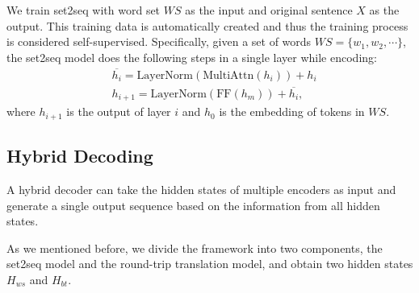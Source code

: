 We train set2seq with word set $WS$ as the input and original sentence 
$X$ as the output. This training data is automatically created and thus
the training process is considered self-supervised.
Specifically, given a set of words $WS = \{w_1, w_2,\cdots\}$, the set2seq model does the following steps in a single layer while encoding:
\begin{align}
& \overline{h_{i}} = \text{LayerNorm}(\text{MultiAttn}(h_{i})) + h_{i} \\
& h_{i+1} = \text{LayerNorm}(\text{FF}(h_{m})) + \overline{h_{i}},
\end{align}
where $h_{i+1}$ is the output of layer $i$ and $h_0$ is the embedding of tokens in $WS$.



\subsection{Hybrid Decoding}\label{sec:joint}
A hybrid decoder can take the hidden states of multiple encoders as input and generate a single output sequence based on the information from all hidden states.

As we mentioned before, we divide the framework into two components, the set2seq model and the round-trip translation model, and obtain two hidden states $H_{ws}$ and $H_{bt}$. 

